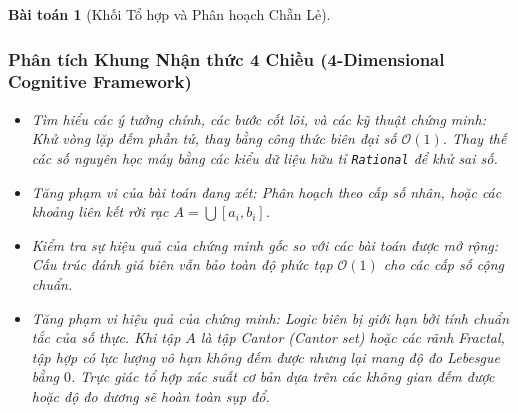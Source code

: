 \documentclass{article}
\newtheorem{baitoan}{Bài toán}
\begin{document}
\begin{baitoan}[Khối Tổ hợp và Phân hoạch Chẵn Lẻ]
 \subsubsection*{Phân tích Khung Nhận thức 4 Chiều (4-Dimensional Cognitive Framework)}
 \begin{itemize}
 \item \textit{Tìm hiểu các ý tưởng chính, các bước cốt lõi, và các kỹ thuật chứng minh}: Khử vòng lặp đếm phần tử, thay bằng công thức biên đại số $\mathcal{O}(1)$. Thay thế các số nguyên học máy bằng các kiểu dữ liệu hữu tỉ \texttt{Rational} để khử sai số.
 \item \textit{Tăng phạm vi của bài toán đang xét}: Phân hoạch theo cấp số nhân, hoặc các khoảng liên kết rời rạc $A = \bigcup [a_i, b_i]$.
 \item \textit{Kiểm tra sự hiệu quả của chứng minh gốc so với các bài toán được mở rộng}: Cấu trúc đánh giá biên vẫn bảo toàn độ phức tạp $\mathcal{O}(1)$ cho các cấp số cộng chuẩn.
 \item \textit{Tăng phạm vi hiệu quả của chứng minh}: Logic biên bị giới hạn bởi tính chuẩn tắc của số thực. Khi tập $A$ là tập Cantor (Cantor set) hoặc các rãnh Fractal, tập hợp có lực lượng vô hạn không đếm được nhưng lại mang độ đo Lebesgue bằng $0$. Trực giác tổ hợp xác suất cơ bản dựa trên các không gian đếm được hoặc độ đo dương sẽ hoàn toàn sụp đổ.
 \end{itemize}
\end{baitoan}

\end{document}
